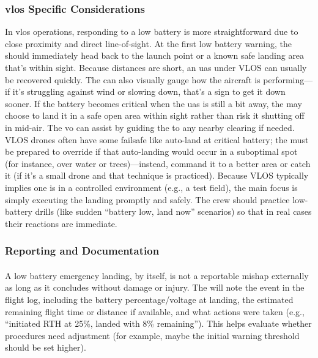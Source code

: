             \subsubsection{\ac{vlos} Specific Considerations} In \ac{vlos} operations, responding to a low battery is more straightforward due to close proximity and direct line-of-sight. At the first low battery warning, the  should immediately head back to the launch point or a known safe landing area that’s within sight. Because distances are short, an \ac{uas} under VLOS can usually be recovered quickly. The  can also visually gauge how the aircraft is performing—if it’s struggling against wind or slowing down, that’s a sign to get it down sooner. If the battery becomes critical when the \ac{uas} is still a bit away, the  may choose to land it in a safe open area within sight rather than risk it shutting off in mid-air. The \ac{vo} can assist by guiding the  to any nearby clearing if needed. VLOS drones often have some failsafe like auto-land at critical battery; the  must be prepared to override if that auto-landing would occur in a suboptimal spot (for instance, over water or trees)—instead, command it to a better area or catch it (if it’s a small drone and that technique is practiced). Because VLOS typically implies one is in a controlled environment (e.g., a test field), the main focus is simply executing the landing promptly and safely. The crew should practice low-battery drills (like sudden “battery low, land now” scenarios) so that in real cases their reactions are immediate.
 
            \subsubsection{Reporting and Documentation}
            
                \paragraph{} A low battery emergency landing, by itself, is not a reportable mishap externally as long as it concludes without damage or injury. The  will note the event in the flight log, including the battery percentage/voltage at landing, the estimated remaining flight time or distance if available, and what actions were taken (e.g., “initiated RTH at 25\%, landed with 8\% remaining”). This helps evaluate whether procedures need adjustment (for example, maybe the initial warning threshold should be set higher).
                
